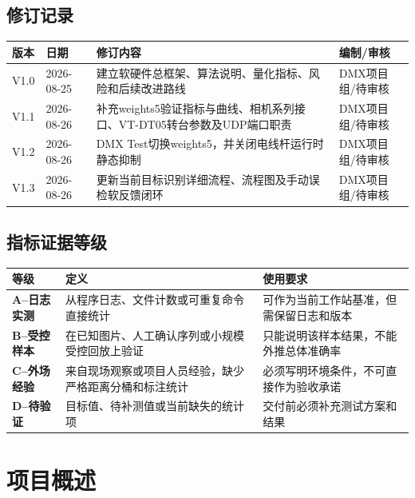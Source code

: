 \documentclass[UTF8,a4paper,11pt,openany]{ctexrep}
\newcommand{\metricA}{\textcolor{dmxgreen}{\textbf{A--日志实测}}}
\newcommand{\metricB}{\textcolor{dmxblue}{\textbf{B--受控样本}}}
\newcommand{\metricC}{\textcolor{orange!80!black}{\textbf{C--外场经验}}}
\newcommand{\metricD}{\textcolor{dmxred}{\textbf{D--待验证}}}
\begin{document}
\section*{修订记录}
\begin{table}[H]
  \centering
  \begin{tabularx}{\textwidth}{p{1.8cm}p{2.5cm}X p{2.7cm}}
    \toprule
    版本 & 日期 & 修订内容 & 编制/审核 \\
    \midrule
    V1.0 & 2026-08-25 & 建立软硬件总框架、算法说明、量化指标、风险和后续改进路线 & DMX项目组/待审核 \\
    V1.1 & 2026-08-26 & 补充weights5验证指标与曲线、相机系列接口、VT-DT05转台参数及UDP端口职责 & DMX项目组/待审核 \\
    V1.2 & 2026-08-26 & DMX Test切换weights5，并关闭电线杆运行时静态抑制 & DMX项目组/待审核 \\
    V1.3 & 2026-08-26 & 更新当前目标识别详细流程、流程图及手动误检软反馈闭环 & DMX项目组/待审核 \\
    \bottomrule
  \end{tabularx}
\end{table}

\section*{指标证据等级}
\begin{table}[H]
  \centering
  \begin{tabularx}{\textwidth}{p{2.8cm}X p{4.1cm}}
    \toprule
    等级 & 定义 & 使用要求 \\
    \midrule
    \metricA & 从程序日志、文件计数或可重复命令直接统计 & 可作为当前工作站基准，但需保留日志和版本 \\
    \metricB & 在已知图片、人工确认序列或小规模受控回放上验证 & 只能说明该样本结果，不能外推总体准确率 \\
    \metricC & 来自现场观察或项目人员经验，缺少严格距离分桶和标注统计 & 必须写明环境条件，不可直接作为验收承诺 \\
    \metricD & 目标值、待补测值或当前缺失的统计项 & 交付前必须补充测试方案和结果 \\
    \bottomrule
  \end{tabularx}
\end{table}

\tableofcontents
\clearpage
{}

\chapter{项目概述}
\end{document}
